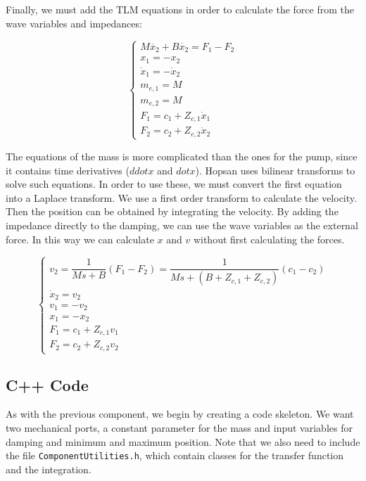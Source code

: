 \documentclass[a4paper,pdftex]{article}
\begin{document}
\noindent Finally, we must add the TLM equations in order to calculate the force from the wave variables and impedances:

\begin{equation*}
\begin{cases}
M\ddot{x_{2}} + B\dot{x_{2}} = F_{1} - F_{2}\\
x_{1} = -x_{2} \\
\dot{x}_{1} = -\dot{x}_{2} \\
m_{e,1} = M \\
m_{e,2} = M \\
F_{1} = c_{1} + Z_{c,1}\dot{x}_{1} \\
F_{2} = c_{2} + Z_{c,2}\dot{x}_{2} 
\end{cases}
\end{equation*}

\noindent The equations of the mass is more complicated than the ones for the pump, since it contains time derivatives ($ddot{x}$ and $dot{x}$). Hopsan uses bilinear transforms to solve such equations. In order to use these, we must convert the first equation into a Laplace transform. We use a first order transform to calculate the velocity. Then the position can be obtained by integrating the velocity. By adding the impedance directly to the damping, we can use the wave variables as the external force. In this way we can calculate $x$ and $v$ without first calculating the forces. 

\begin{equation*}
\begin{cases}
v_{2} = \dfrac{1}{M s + B}(F_{1}-F_{2}) = \dfrac{1}{M s + (B+Z_{c,1}+Z_{c,2})}(c_{1}-c_{2}) \\
\dot{x}_{2} = v_{2} \\
v_{1} = -v_{2} \\
x_{1} = -x_{2} \\
F_{1} = c_{1} + Z_{c,1}v_{1} \\
F_{2} = c_{2} + Z_{c,2}v_{2} 
\end{cases}
\end{equation*}

\subsection*{C++ Code}
As with the previous component, we begin by creating a code skeleton. We want two mechanical ports, a constant parameter for the mass and input variables for damping and minimum and maximum position. Note that we also need to include the file \texttt{ComponentUtilities.h}, which contain classes for the transfer function and the integration.
 	
\end{document}
